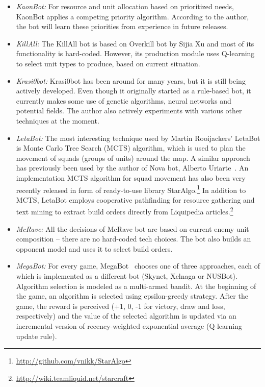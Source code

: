 \begin{itemize}
  \item {\em KaonBot:} For resource and unit allocation based on prioritized needs, KaonBot applies a competing priority algorithm. According to the author, the bot will learn these priorities from experience in future releases.
  
  \item {\em KillAll:} The KillAll bot is based on Overkill bot by Sijia Xu and most of its functionality is hard-coded. However, its production module uses Q-learning to select unit types to produce, based on current situation. 
    
  \item {\em Krasi0bot:} Krasi0bot has been around for many years, but it is still being actively developed. Even though it originally started as a rule-based bot, it currently makes some use of genetic algorithms, neural networks and potential fields. The author also actively experiments with various other techniques at the moment.
  
  \item {\em LetaBot:} The most interesting technique used by Martin Rooijackers' LetaBot is Monte Carlo Tree Search (MCTS) algorithm, which is used to plan the movement of squads (groups of units) around the map. A similar approach has previously been used by the author of Nova bot, Alberto Uriarte~\cite{uriarte2014high}. An implementation MCTS algorithm for squad movement has also been very recently released in form of ready-to-use library StarAlgo.\footnote{\url{http://github.com/vnikk/StarAlgo}} In addition to MCTS, LetaBot employs cooperative pathfinding for resource gathering and text mining to extract build orders directly from Liquipedia articles.\footnote{\url{http://wiki.teamliquid.net/starcraft}}     

  \item {\em McRave:} All the decisions of McRave bot are based on current enemy unit composition -- there are no hard-coded tech choices. The bot also builds an opponent model and uses it to select build orders. 

  \item {\em MegaBot:} For every game, MegaBot~\cite{tavares2016rock} chooses one of three approaches, each of which is implemented as a different bot (Skynet, Xelnaga or NUSBot). Algorithm selection is modeled as a multi-armed bandit. At the beginning of the game, an algorithm is selected using epsilon-greedy strategy. After the game, the reward is perceived (+1, 0, -1 for victory, draw and loss, respectively) and the value of the selected algorithm is updated via an incremental version of recency-weighted exponential average (Q-learning update rule).
  

\end{itemize}
